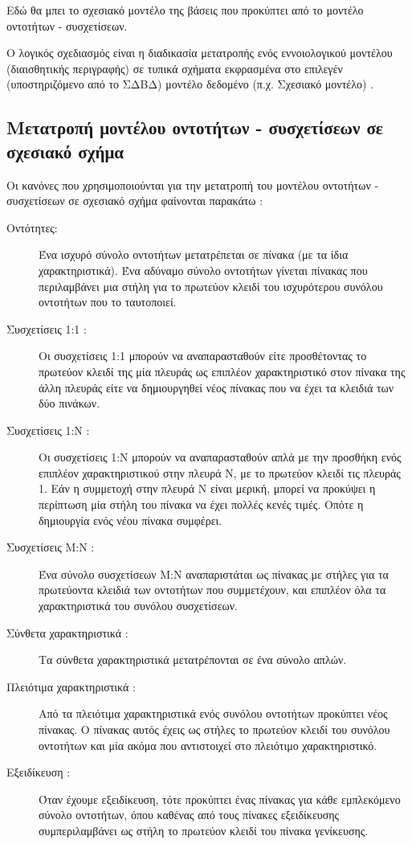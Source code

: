 \documentclass{assignment}
\begin{document}
Εδώ θα μπει το σχεσιακό μοντέλο της βάσεις που προκύπτει από το μοντέλο οντοτήτων - συσχετίσεων.

Ο λογικός σχεδιασμός είναι η διαδικασία μετατροπής ενός εννοιολογικού μοντέλου (διαισθητικής περιγραφής) σε τυπικά σχήματα εκφρασμένα στο επιλεγέν (υποστηριζόμενο από το ΣΔΒΔ) μοντέλο δεδομένο (π.χ. Σχεσιακό μοντέλο) \cite{class_notes}.

\subsection{Μετατροπή μοντέλου οντοτήτων - συσχετίσεων σε σχεσιακό σχήμα}

Οι κανόνες που χρησιμοποιούνται για την μετατροπή του μοντέλου οντοτήτων - συσχετίσεων σε σχεσιακό σχήμα φαίνονται παρακάτω \cite{class_notes}:

\begin{description}

  \item[Οντότητες:] Ένα ισχυρό σύνολο οντοτήτων μετατρέπεται σε πίνακα (με τα ίδια χαρακτηριστικά). Ένα αδύναμο σύνολο οντοτήτων γίνεται πίνακας που περιλαμβάνει μια στήλη για το πρωτεύον κλειδί του ισχυρότερου συνόλου οντοτήτων που το ταυτοποιεί. 
  \item[Συσχετίσεις 1:1 :] Οι συσχετίσεις 1:1 μπορούν να αναπαρασταθούν είτε προσθέτοντας το πρωτεύον κλειδί της μία πλευράς ως επιπλέον χαρακτηριστικό στον πίνακα της άλλη πλευράς είτε να δημιουργηθεί νέος πίνακας που να έχει τα κλειδιά των δύο πινάκων.
  \item[Συσχετίσεις 1:Ν :] Οι συσχετίσεις 1:Ν μπορούν να αναπαρασταθούν απλά με την προσθήκη ενός επιπλέον χαρακτηριστικού στην πλευρά Ν, με το πρωτεύον κλειδί τις πλευράς 1. Εάν η συμμετοχή στην πλευρά Ν είναι μερική, μπορεί να προκύψει η περίπτωση μία στήλη του πίνακα να έχει πολλές κενές τιμές. Οπότε η δημιουργία ενός νέου πίνακα συμφέρει.
  \item[Συσχετίσεις Μ:Ν :] Ένα σύνολο συσχετίσεων M:N αναπαριστάται ως πίνακας με στήλες για τα πρωτεύοντα κλειδιά των οντοτήτων που συμμετέχουν, και επιπλέον όλα τα χαρακτηριστικά του συνόλου συσχετίσεων. 
  \item[Σύνθετα χαρακτηριστικά :] Τα σύνθετα χαρακτηριστικά μετατρέπονται σε ένα σύνολο απλών.
  \item[Πλειότιμα χαρακτηριστικά :] Από τα πλειότιμα χαρακτηριστικά ενός συνόλου οντοτήτων προκύπτει νέος πίνακας. Ο πίνακας αυτός έχεις ως στήλες το πρωτεύον κλειδί του συνόλου οντοτήτων και μία ακόμα που αντιστοιχεί στο πλειότιμο χαρακτηριστικό.
  \item[Εξειδίκευση :] Όταν έχουμε εξειδίκευση, τότε προκύπτει ένας πίνακας για κάθε εμπλεκόμενο σύνολο οντοτήτων, όπου καθένας από τους πίνακες εξειδίκευσης συμπεριλαμβάνει ως στήλη το πρωτεύον κλειδί του πίνακα γενίκευσης.
 
\end{description}
\end{document}
